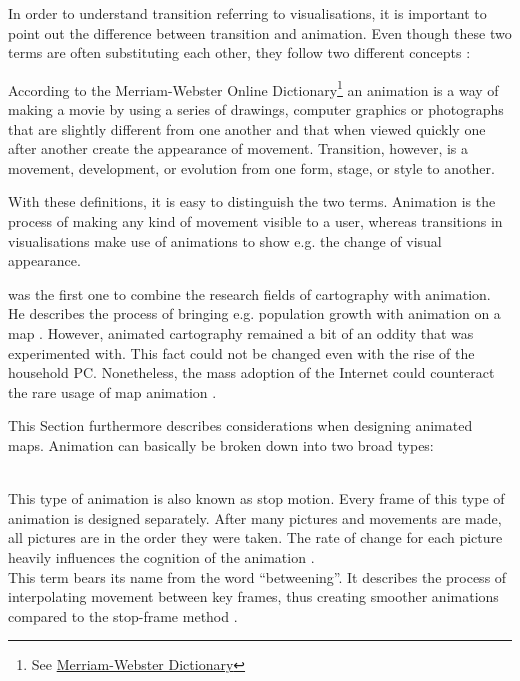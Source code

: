 In order to understand transition referring to visualisations, it is important to point out the difference between transition and animation. Even though these two terms are often substituting each other, they follow two different concepts :

According to the Merriam-Webster Online Dictionary\footnote{See \href{http://www.merriam-webster.com/}{Merriam-Webster Dictionary}} an animation is a way of making a movie by using a series of drawings, computer graphics or photographs that are slightly different from one another and that when viewed quickly one after another create the appearance of movement. Transition, however, is a movement, development, or evolution from one form, stage, or style to another.

With these definitions, it is easy to distinguish the two terms. Animation is the process of making any kind of movement visible to a user, whereas transitions in visualisations make use of animations to show e.g. the change of visual appearance.

\citeauthor{Thrower1959} was the first one to combine the research fields of cartography with animation. He describes the process of bringing e.g. population growth with animation on a map . However, animated cartography remained a bit of an oddity that was experimented with. This fact could not be changed even with the rise of the household \ac{PC}. Nonetheless, the mass adoption of the Internet could counteract the rare usage of map animation .

This Section furthermore describes considerations when designing animated maps. Animation can basically be broken down into two broad types:

\begin{enumerate}
 \hfill \\
This type of animation is also known as stop motion. Every frame of this type of animation is designed separately. After many pictures and movements are made, all pictures are in the order they were taken. The rate of change for each picture heavily influences the cognition of the animation .
 \hfill \\
    This term bears its name from the word ``betweening''. It describes the process of interpolating movement between key frames, thus creating smoother animations compared to the stop-frame method .
\end{enumerate}

